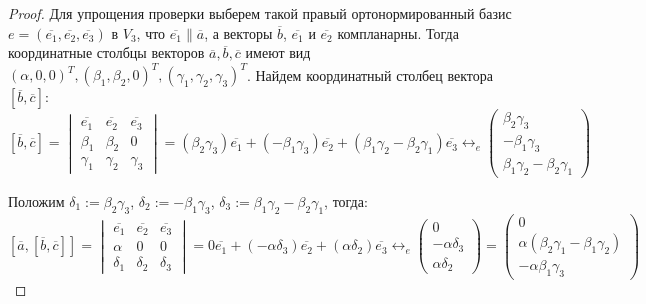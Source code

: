 \begin{proof}
	Для упрощения проверки выберем такой правый ортонормированный базис $e = (\overline{e_1}, \overline{e_2}, \overline{e_3})$ в $V_3$, что $\overline{e_1} \parallel \overline{a}$, а векторы $\overline{b}$, $\overline{e_1}$ и $\overline{e_2}$ компланарны. Тогда координатные столбцы векторов $\overline{a}, \overline{b}, \overline{c}$ имеют вид $(\alpha, 0, 0)^T, (\beta_1, \beta_2, 0)^T, (\gamma_1, \gamma_2, \gamma_3)^T$. Найдем координатный столбец вектора $[\overline{b}, \overline{c}]$:
	\[[\overline{b}, \overline{c}] =
	\begin{vmatrix}
		\overline{e_1} & \overline{e_2} & \overline{e_3}\\
		\beta_1 & \beta_2 & 0\\
		\gamma_1 & \gamma_2 & \gamma_3
	\end{vmatrix} = (\beta_2\gamma_3)\overline{e_1} + (-\beta_1\gamma_3)\overline{e_2} + (\beta_1\gamma_2 - \beta_2\gamma_1)\overline{e_3} \leftrightarrow_{e}
	\begin{pmatrix}
		\beta_2\gamma_3\\-\beta_1\gamma_3\\\beta_1\gamma_2 - \beta_2\gamma_1
	\end{pmatrix}\]
	
	Положим $\delta_1 := \beta_2\gamma_3$, $\delta_2 := -\beta_1\gamma_3$, $\delta_3 := \beta_1\gamma_2 - \beta_2\gamma_1$, тогда:
	\[
	[\overline{a}, [\overline{b}, \overline{c}]] =
	\begin{vmatrix}
	\overline{e_1} & \overline{e_2} & \overline{e_3}\\
	\alpha & 0 & 0\\
	\delta_1 & \delta_2 & \delta_3
	\end{vmatrix} = 
	0\overline{e_1} + (-\alpha\delta_3)\overline{e_2} + (\alpha\delta_2)\overline{e_3} \leftrightarrow_{e}
	\begin{pmatrix}
	0\\-\alpha\delta_3\\\alpha\delta_2
	\end{pmatrix} = 
	\begin{pmatrix}
	0\\\alpha(\beta_2\gamma_1 - \beta_1\gamma_2)\\-\alpha\beta_1\gamma_3
	\end{pmatrix}
	\]
	

\end{proof}
